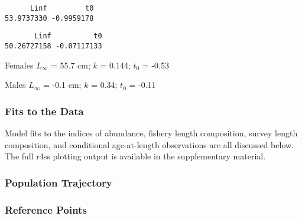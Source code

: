 \documentclass[11pt,
  english,
  a4paper,
]{article}
\begin{document}
\leavevmode\tagmcend\tagstructend


\begin{verbatim}
      Linf         t0 
53.9737330 -0.9959178 
\end{verbatim}

\leavevmode\tagmcend\tagstructend


\begin{verbatim}
       Linf          t0 
50.26727158 -0.07117133 
\end{verbatim}

\leavevmode\tagmcend\tagstructend

\begin{centering}

Females $L_{\infty}$ = 55.7 cm; $k$ = 0.144; $t_0$ = -0.53

Males $L_{\infty}$ = -0.1 cm; $k$ = 0.34; $t_0$ = -0.11

\end{centering}

\vspace{0.5cm}


\hypertarget{fits-to-the-data}{%
\subsubsection{Fits to the Data}\label{fits-to-the-data}}

\leavevmode\tagmcend\tagstructend

Model fits to the indices of abundance, fishery length composition, survey length composition, and conditional age-at-length observations are all discussed below. The full r4ss plotting output is available in the supplementary material.


\hypertarget{population-trajectory}{%
\subsubsection{Population Trajectory}\label{population-trajectory}}

\leavevmode\tagmcend\tagstructend


\hypertarget{reference-points-1}{%
\subsubsection{Reference Points}\label{reference-points-1}}
\end{document}
